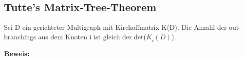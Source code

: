 \subsection{Tutte's Matrix-Tree-Theorem}
\begin{Tms}
Sei D ein gerichteter Multigraph mit Kirchoffmatrix K(D). Die Anzahl der out-branchings aus dem Knoten i ist gleich der det($K_{\bar{i}}(D)$).
\end{Tms}
\textbf{Beweis:} 
